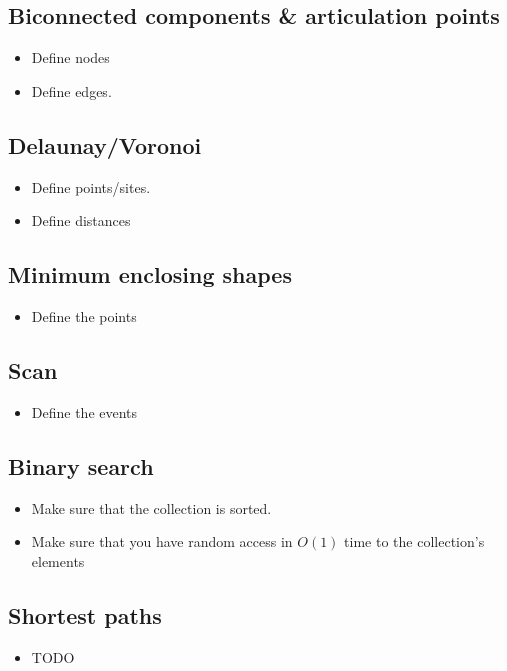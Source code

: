 \documentclass[guide.tex]{subfiles}
\begin{document}
\subsection{Biconnected components \& articulation points}
\begin{itemize}
  \item Define nodes
  \item Define edges.
\end{itemize}

\subsection{Delaunay/Voronoi}
\begin{itemize}
  \item Define points/sites.
  \item Define distances
\end{itemize}

\subsection{Minimum enclosing shapes}
\begin{itemize}
  \item Define the points
\end{itemize}

\subsection{Scan}
\begin{itemize}
  \item Define the events
\end{itemize}

\subsection{Binary search}
\begin{itemize}
  \item Make sure that the collection is sorted.
  \item Make sure that you have random access in $O(1)$ time to the collection's elements
\end{itemize}

\subsection{Shortest paths}
\begin{itemize}
  \item TODO
\end{itemize}
\end{document}
